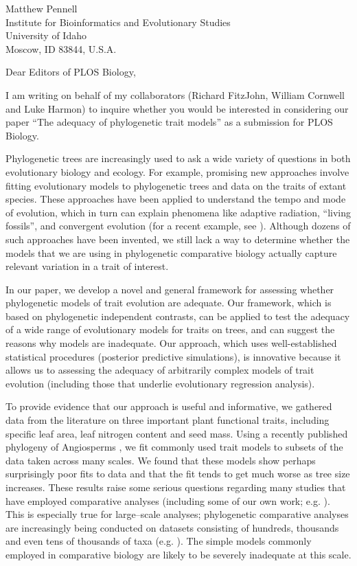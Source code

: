 \documentclass[a4paper,12pt]{article}
\begin{document}
{\raggedright
  Matthew Pennell\\
  Institute for Bioinformatics and Evolutionary Studies\\
  University of Idaho\\
 Moscow, ID 83844, U.S.A.\\[2ex]
}

\vspace{3ex}

Dear Editors of PLOS Biology,

I am writing on behalf of my collaborators (Richard FitzJohn, William Cornwell and Luke Harmon) to inquire whether you would be interested in considering our paper ``The adequacy of phylogenetic trait models'' as a submission for PLOS Biology. 

Phylogenetic trees are increasingly used to ask a wide variety of questions in both evolutionary biology and ecology. For example, promising new approaches involve fitting evolutionary models to phylogenetic trees and data on the traits of extant species. These approaches have been applied to understand the tempo and mode of evolution, which in turn can explain phenomena like adaptive radiation, ``living fossils'', and convergent evolution (for a recent example, see \citep{Mahler2013}). Although dozens of such approaches have been invented, we still lack a way to determine whether the models that we are using in phylogenetic comparative biology actually capture relevant variation in a trait of interest. 

In our paper, we develop a novel and general framework for assessing whether phylogenetic models of trait evolution are adequate.  Our framework, which is based on phylogenetic independent contrasts, can be applied to test the adequacy of a wide range of evolutionary models for traits on trees, and can suggest the reasons why models are inadequate. Our approach, which uses well-established statistical procedures (posterior predictive simulations), is innovative because it allows us to assessing the adequacy of arbitrarily complex models of trait evolution (including those that underlie evolutionary regression analysis).

To provide evidence that our approach is useful and informative, we gathered data from the literature on three important plant functional traits, including specific leaf area, leaf nitrogen content and seed mass. Using a recently published phylogeny of Angiosperms \citep{Zanne2013}, we fit commonly used trait models to subsets of the data taken across many scales. We found that these models show perhaps surprisingly poor fits to data and that the fit tends to get much worse as tree size increases. These results raise some serious questions regarding many studies that have employed comparative analyses (including some of our own work; e.g. \citep{Harmon2010}). This is especially true for large--scale analyses; phylogenetic comparative analyses are increasingly being conducted on datasets consisting of hundreds, thousands and even tens of thousands of taxa (e.g. \citep{Venditti2011, Rabosky2013}). The simple models commonly employed in comparative biology are likely to be severely inadequate at this scale. 
\end{document}
